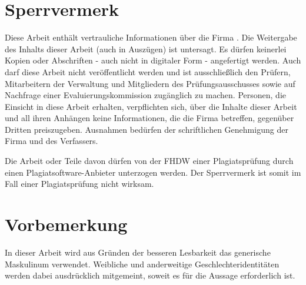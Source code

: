 \section*{Sperrvermerk}

Diese Arbeit enthält vertrauliche Informationen über die Firma \koorperationsunternehmen. Die Weitergabe des Inhalts dieser Arbeit (auch in Auszügen) ist untersagt. Es dürfen keinerlei Kopien oder Abschriften - auch nicht in digitaler Form - angefertigt werden. Auch darf diese Arbeit nicht veröffentlicht werden und ist ausschließlich den Prüfern, Mitarbeitern der Verwaltung und Mitgliedern des Prüfungsausschusses sowie auf Nachfrage einer Evaluierungskommission zugänglich zu machen. Personen, die Einsicht in diese Arbeit erhalten, verpflichten sich, über die Inhalte dieser Arbeit und all ihren Anhängen keine Informationen, die die Firma \koorperationsunternehmen{} betreffen, gegenüber Dritten preiszugeben. Ausnahmen bedürfen der schriftlichen Genehmigung der Firma \koorperationsunternehmen{} und des Verfassers.


Die Arbeit oder Teile davon dürfen von der FHDW einer Plagiatsprüfung durch einen Plagiatsoftware-Anbieter unterzogen werden. Der Sperrvermerk ist somit im Fall einer Plagiatsprüfung nicht wirksam.

\section*{Vorbemerkung}

In dieser Arbeit wird aus Gründen der besseren Lesbarkeit das generische Maskulinum verwendet. Weibliche und anderweitige Geschlechteridentitäten werden dabei ausdrücklich mitgemeint, soweit es für die Aussage erforderlich ist.

\newpage
\fancyhead[R]{\leftmark}